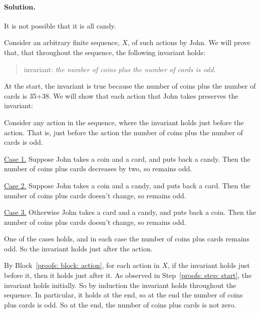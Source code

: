 \paragraph{Solution.}
\begin{theorem}
  It is not possible that it is all candy.
\end{theorem}
\begin{longFormProof}
  \step Consider an arbitrary finite sequence, $X$, of such actions by John.
  \step We will prove that, that throughout the sequence, the following invariant holds:
  \begin{quote}
    invariant: \emph{the number of coins plus the number of cards is odd.}
  \end{quote}
  \step\label{proofs: step: start}
  At the start, the invariant is true because the number of coins plus the number of cards is 35+38.
  \step We will show that each action that John takes preserves the invariant:
  \begin{block}\label{proofs: block: action}
    \step Consider any action in the sequence, where the invariant holds just before the action.
    \step That is, just before the action the number of coins plus the number of cards is odd.
    \begin{block}
      \step \underline{Case 1.}  Suppose John takes a coin and a card, and puts back a candy.
      \step Then the number of coins plus cards decreases by two, so remains odd.
    \end{block}
    \begin{block}
      \step \underline{Case 2.}  Suppose John takes a coin and a candy, and puts back a card.
      \step Then the number of coins plus cards doesn't change, so remains odd.
    \end{block}
    \begin{block}
      \step \underline{Case 3.}  Otherwise John takes a card and a candy, and puts back a coin.
      \step Then the number of coins plus cards doesn't change, so remains odd.
    \end{block}
    \step One of the cases holds, and in each case the number of coins plus cards remains odd.
    \step So the invariant holds just after the action.
  \end{block}
  \step By Block~\ref{proofs: block: action}, for each action in $X$,
  if the invariant holds just before it, then it holds just after it.
  \step As observed in Step~\ref{proofs: step: start}, the invariant holds initially.
  \step So by induction the invariant holds throughout the sequence.
  \step In particular, it holds at the end, so at the end the number of coins plus cards is odd.
  \step So at the end, the number of coins plus cards is not zero.
\end{longFormProof}

